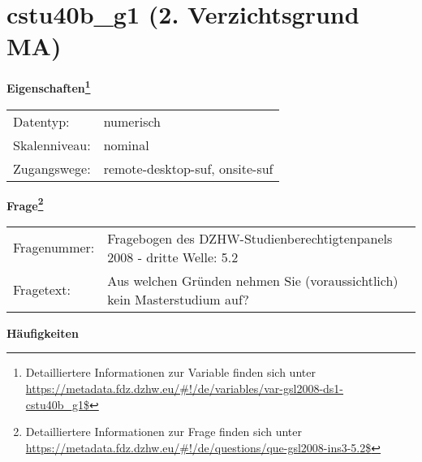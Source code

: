 
    \setcounter{footnote}{0}

    \vspace*{-1.8cm}
	\section{cstu40b\_g1 (2. Verzichtsgrund MA)}
	\label{section:cstu40b_g1}



    \vspace*{0.5cm}
    \noindent\textbf{Eigenschaften\footnote{Detailliertere Informationen zur Variable finden sich unter
		\url{https://metadata.fdz.dzhw.eu/\#!/de/variables/var-gsl2008-ds1-cstu40b_g1$}}}\\
	\begin{tabularx}{\hsize}{@{}lX}
	Datentyp: & numerisch \\
	Skalenniveau: & nominal \\
	Zugangswege: &
	  remote-desktop-suf, 
	  onsite-suf
 \\
    \end{tabularx}



				\vspace*{0.5cm}
                \noindent\textbf{Frage\footnote{Detailliertere Informationen zur Frage finden sich unter
		              \url{https://metadata.fdz.dzhw.eu/\#!/de/questions/que-gsl2008-ins3-5.2$}}}\\
				\begin{tabularx}{\hsize}{@{}lX}
					Fragenummer: &
					  Fragebogen des DZHW-Studienberechtigtenpanels 2008 - dritte Welle:
					  5.2
 \\
					Fragetext: & Aus welchen Gründen nehmen Sie (voraussichtlich) kein Masterstudium auf? \\
				\end{tabularx}





        		\vspace*{0.5cm}
                \noindent\textbf{Häufigkeiten}

